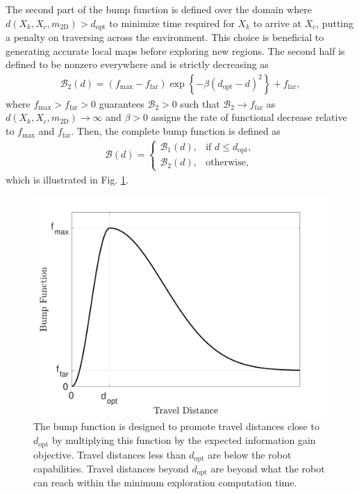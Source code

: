 \documentclass[smallextended]{svjour3}       %
\newcommand{\braces}[1]{\ensuremath{\left\{ #1 \right\}}}
\begin{document}
The second part of the bump function is defined over the domain where \\$d(X_k,X_c,m_\text{2D})>d_\text{opt}$ to minimize time required for $X_k$ to arrive at $X_c$, putting a penalty on traversing across the environment. This choice is beneficial to generating accurate local maps before exploring new regions. The second half is defined to be nonzero everywhere and is strictly decreasing as 
\begin{align}
\label{eqn:BumpFunDecreasing}
\mathcal B_2(d)=(f_\text{max}-f_\text{far})\exp\braces{-\beta(d_\text{opt}-d)^2}+f_\text{far},
\end{align}
where $f_\text{max}>f_\text{far}>0$ guarantees $\mathcal B_2>0$ such that $\mathcal B_2\rightarrow f_\text{far}$ as $d(X_k,X_c,m_\text{2D})\rightarrow\infty$ and $\beta>0$ assigns the rate of functional decrease relative to $f_\text{max}$ and $f_\text{far}$. Then, the complete bump function is defined as
\begin{align}
\label{eqn:BumpFun}
\mathcal B(d)=
\begin{cases}
    \mathcal B_1(d),		& \text{if }d\leq d_\text{opt},\\
    \mathcal B_2(d),         & \text{otherwise},
\end{cases}
\end{align}
which is illustrated in Fig. \ref{fig:nonzeroBumpFun}. %

	\begin{figure}
		\centerline{
			\includegraphics[width=0.9\columnwidth]{NonZeroBump.pdf}
		}
		\caption{The bump function is designed to promote travel distances close to $d_\text{opt}$ by multiplying this function by the expected information gain objective. Travel distances less than $d_\text{opt}$ are below the robot capabilities. Travel distances beyond $d_\text{opt}$ are beyond what the robot can reach within the minimum exploration computation time.}
		\label{fig:nonzeroBumpFun}
	\end{figure}
	
\end{document}
